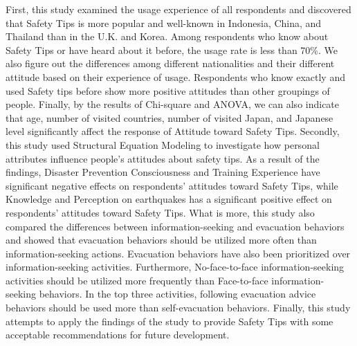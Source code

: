 First, this study examined the usage experience of all respondents and discovered that Safety Tips is more popular and well-known in Indonesia, China, and Thailand than in the U.K. and Korea. Among respondents who know about Safety Tips or have heard about it before, the usage rate is less than 70\%. We also figure out the differences among different nationalities and their different attitude based on their experience of usage. Respondents who know exactly and used Safety tips before show more positive attitudes than other groupings of people. Finally, by the results of Chi-square and ANOVA, we can also indicate that age, number of visited countries, number of visited Japan, and Japanese level significantly affect the response of Attitude toward Safety Tips. Secondly, this study used Structural Equation Modeling to investigate how personal attributes influence people's attitudes about safety tips. As a result of the findings, Disaster Prevention Consciousness and Training Experience have significant negative effects on respondents' attitudes toward Safety Tips, while Knowledge and Perception on earthquakes has a significant positive effect on respondents' attitudes toward Safety Tips. What is more, this study also compared the differences between information-seeking and evacuation behaviors and showed that evacuation behaviors should be utilized more often than information-seeking actions. Evacuation behaviors have also been prioritized over information-seeking activities. Furthermore, No-face-to-face information-seeking activities should be utilized more frequently than Face-to-face information-seeking behaviors. In the top three activities, following evacuation advice behaviors should be used more than self-evacuation behaviors. Finally, this study attempts to apply the findings of the study to provide Safety Tips with some acceptable recommendations for future development. 


\cleardoublepage
